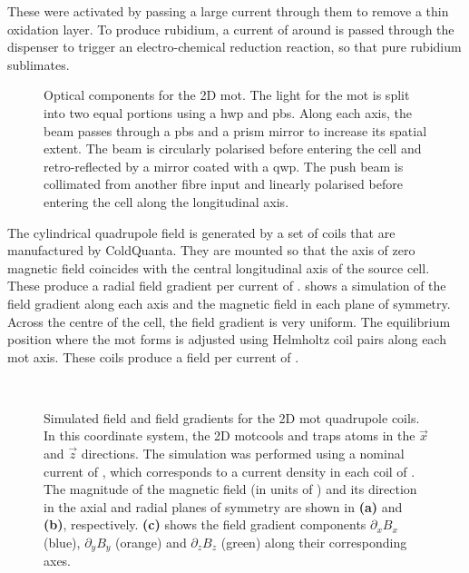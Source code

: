 These were activated by passing a large current through them to remove a thin
oxidation layer. To produce rubidium, a current of around  is passed through the dispenser
to trigger an electro-chemical reduction reaction, so that pure rubidium sublimates.
\begin{figure}[!htbp]
	\centering
	\def\svgwidth{0.7\textwidth}
	
	\caption[Optical components for the 2D \ac{mot}]{Optical components for the 2D \ac{mot}. The light for the \ac{mot} is split into two equal portions using a \ac{hwp} and \ac{pbs}. Along each axis, the beam passes through a \ac{pbs} and a prism mirror to increase its spatial extent. The beam is circularly polarised before entering the cell and retro-reflected by a mirror coated with a \ac{qwp}. The push beam is collimated from another fibre input and linearly polarised before entering the cell along the longitudinal axis.}
	\label{fig:2D_mot_optics}
\end{figure}
\par\noindent The cylindrical quadrupole field is generated by a set of coils
that are manufactured by ColdQuanta. They are mounted so that the axis of
zero magnetic field coincides with the central longitudinal axis of the source
cell. These produce a radial field gradient per current of
.
 shows a simulation of the field
gradient along each axis and the magnetic field in each plane of
symmetry. 
Across the centre of the cell, the field gradient is very uniform. The
equilibrium position where the \ac{mot} forms is adjusted using
Helmholtz coil pairs along each \ac{mot} axis. These coils produce a
field per current of
.
\begin{figure}[!htbp]
	\centering
	\def\svgwidth{\columnwidth}
	\\
	\caption[Simulated field and field gradients for the 2D \ac{mot} quadrupole
		coils]{Simulated field and field gradients for the 2D \ac{mot}
		quadrupole coils. In this coordinate system, the 2D \ac{mot}cools and
		traps atoms in the \(\vec{x}\) and \(\vec{z}\) directions. The
		simulation was performed using a nominal current of
		, which corresponds to a current density in each
		coil of . The magnitude of
		the magnetic field (in units of \sivalue{}{\gauss}) and its direction in
		the axial and radial planes of symmetry are shown in \textbf{(a)} and
		\textbf{(b)}, respectively. \textbf{(c)} shows the field gradient
		components \(\partial_x B_x\) (blue), \(\partial_y B_y\) (orange) and
		\(\partial_z B_z\) (green) along their corresponding axes.}
	\label{fig:2d_mot_field_gradient}
\end{figure}
